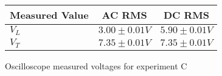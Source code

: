 \begin{figure}[H]    \centering    \begin{tabular}{|l|c|c|}
        \hline
        Measured Value & AC RMS & DC RMS \\
        \hline
        $V_{L}$ & $3.00\pm 0.01\unit{V}$ & $5.90\pm 0.01\unit{V}$ \\
        $V_{T}$ & $7.35\pm 0.01\unit{V}$ & $7.35\pm 0.01\unit{V}$ \\
        \hline
    \end{tabular}    \caption{Oscilloscope measured voltages for experiment C}\end{figure}